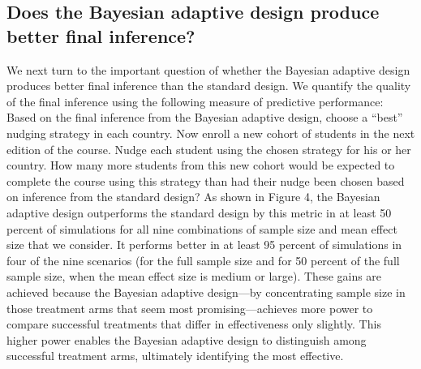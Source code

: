 \documentclass{acm_proc_article-sp}
\begin{document}
\subsection{Does the Bayesian adaptive design produce better final inference?}
We next turn to the important question of whether the Bayesian adaptive design produces better final inference than the standard design. We quantify the quality of the final inference using the following measure of predictive performance: Based on the final inference from the Bayesian adaptive design, choose a ``best'' nudging strategy in each country. Now enroll a new cohort of students in the next edition of the course. Nudge each student using the chosen strategy for his or her country. How many more students from this new cohort would be expected to complete the course using this strategy than had their nudge been chosen based on inference from the standard design? 
As shown in Figure 4, the Bayesian adaptive design outperforms the standard design by this metric in at least 50 percent of simulations for all nine combinations of sample size and mean effect size that we consider. It performs better in at least 95 percent of simulations in four of the nine scenarios (for the full sample size and for 50 percent of the full sample size, when the mean effect size is medium or large). These gains are achieved because the Bayesian adaptive design---by concentrating sample size in those treatment arms that seem most promising---achieves more power to compare successful treatments that differ in effectiveness only slightly. This higher power enables the Bayesian adaptive design to distinguish among successful treatment arms, ultimately identifying the most effective. 
\end{document}
